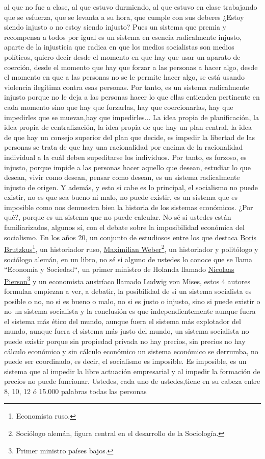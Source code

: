 al que no fue a clase, al que estuvo durmiendo, al que estuvo en clase trabajando que se esfuerza, que se levanta a su hora, que cumple con sus deberes ¿Estoy siendo injusto o no estoy siendo injusto? Pues un sistema que premia y recompensa a todos por igual es un sistema en esencia radicalmente injusto, aparte de la injusticia que radica en que los medios socialistas son medios políticos, quiero decir desde el momento en que hay que usar un aparato de coerción, desde el momento que hay que forzar a las personas a hacer algo, desde el momento en que a las personas no se le permite hacer algo, se está usando violencia ilegítima contra esas personas. Por tanto, es un sistema radicalmente injusto porque no le deja a las personas hacer lo que ellas entienden pertinente en cada momento sino que hay que forzarlas, hay que coercionarlas, hay que impedirles que se muevan,hay que impedirles... La idea propia de planificación, la idea propia de centralización, la idea propia de que hay un plan central, la idea de que hay un consejo superior del plan que decide, es impedir la libertad de las personas se trata de que hay una racionalidad por encima de la racionalidad individual a la cuál deben supeditarse los individuos. Por tanto, es forzoso, es injusto, porque impide a las personas hacer aquello que desean, estudiar lo que desean, vivir como desean, pensar como desean, es un sistema radicalmente injusto de origen. Y además, y esto si cabe es lo principal, el socialismo no puede existir, no es que sea bueno ni malo, no puede existir, es un sistema que es imposible como nos demuestra bien la historia de los sistemas económicos. ¿Por qué?, porque es un sistema que no puede calcular. No sé si ustedes están familiarizados, algunos sí, con el debate sobre la imposibilidad económica del socialismo. En los años 20, un conjunto de estudiosos entre los que destaca \href{Boris Brutzkus}{Boris Brutzkus}\footnote{Economista ruso.}, un historiador ruso, \href{https://en.wikipedia.org/wiki/Max_Weber}{Maximilian Weber}\footnote{Sociólogo alemán, figura central en el desarrollo de la Sociología.}, un historiador y politólogo y sociólogo alemán, en un libro, no sé si alguno de ustedes lo conoce que se llama ``Economía y Sociedad``\cite{weber1921economy}, un primer ministro de Holanda llamado \href{https://en.wikipedia.org/wiki/Nicolaas_Pierson}{Nicolaas Pierson}\footnote{Primer ministro países bajos.} y un economista austríaco llamado Ludwig von Mises, estos 4 autores formulan empiezan a ver, a debatir, la posibilidad de si un sistema socialista es posible o no, no si es bueno o malo, no si es justo o injusto, sino si puede existir o no un sistema socialista y la conclusión es que independientemente aunque fuera el sistema más ético del mundo, aunque fuera el sistema más explotador del mundo, aunque fuera el sistema más justo del mundo, un sistema socialista no puede existir porque sin propiedad privada no hay precios, sin precios no hay cálculo económico y sin cálculo económico un sistema económico se derrumba, no puede ser coordinado, es decir, el socialismo es imposible. Es imposible, es un sistema que al impedir la libre actuación empresarial y al impedir la formación de precios no puede funcionar. Ustedes, cada uno de ustedes,tiene en su cabeza entre 8, 10, 12 ó 15.000 palabras todas las personas 